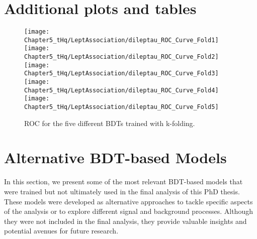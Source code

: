 \section{Additional plots and tables}

\begin{figure}[htbp!]
\centering
\texttt{[image: Chapter5\_tHq/LeptAssociation/dileptau\_ROC\_Curve\_Fold1]}\quad
\texttt{[image: Chapter5\_tHq/LeptAssociation/dileptau\_ROC\_Curve\_Fold2]}\quad
\texttt{[image: Chapter5\_tHq/LeptAssociation/dileptau\_ROC\_Curve\_Fold3]}
\medskip
\texttt{[image: Chapter5\_tHq/LeptAssociation/dileptau\_ROC\_Curve\_Fold4]}\quad
\texttt{[image: Chapter5\_tHq/LeptAssociation/dileptau\_ROC\_Curve\_Fold5]}
\caption{ROC for the five different BDTs trained with k-folding.}
\label{fig:dileptau:Assignment_appendix:ROCs}
\end{figure}

\begin{table}[]
\centering
{}
\caption{Different thresholds for lepton association compared to its correspondent accuracy.}
\label{tab:dileptau:Assignment_appendix:Thereshold_large}
\end{table}




\section{Alternative BDT-based Models}
In this section, we present some of the most relevant BDT-based models that were trained but not ultimately used in the final analysis of this PhD thesis. These models were developed as alternative approaches to tackle specific aspects of the analysis or to explore different signal and background processes. Although they were not included in the final analysis, they provide valuable insights and potential avenues for future research.


